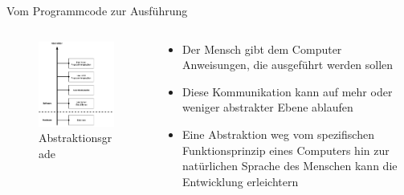     
    
    \begin{frame}{Vom Programmcode zur Ausführung}
        \begin{columns}
            \begin{column}{0.4\textwidth}
                \begin{figure}
                    \centering
                    \includegraphics[width=\linewidth,height=0.6\textheight,keepaspectratio]{chapters/02_computer_science/figures/Abstraction.png}
                    \caption{Abstraktionsgrade}
                    \label{fig:abstraction}
                \end{figure}
            \end{column}
            \begin{column}{0.6\textwidth}
                \begin{itemize}
                    \item Der Mensch gibt dem Computer Anweisungen, die ausgeführt werden sollen
                	\item Diese Kommunikation kann auf mehr oder weniger abstrakter Ebene ablaufen
                	\item Eine Abstraktion weg vom spezifischen Funktionsprinzip eines Computers hin zur natürlichen Sprache des Menschen kann die Entwicklung erleichtern
          	    \end{itemize}
            \end{column}
        \end{columns}
    \end{frame}
    

